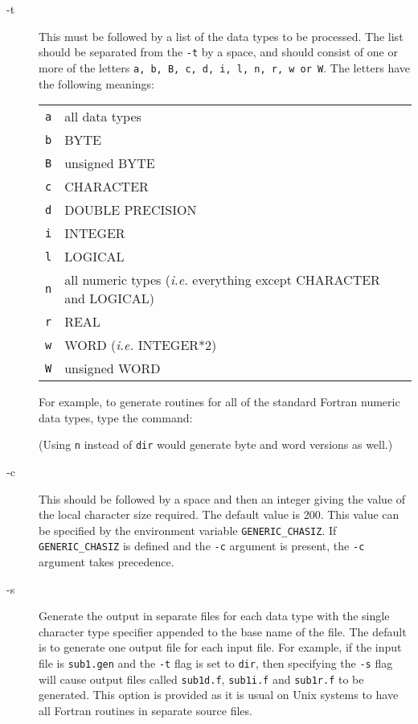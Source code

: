 \documentclass[twoside,11pt,nolof]{starlink}
\begin{document}
\begin{description}

\item[-t] This must be followed by a list of the data types to be
processed. The list should be separated from the \texttt{-t} by a space,
and should consist of one or more of the letters \texttt{a, b, B, c, d, i, l,
n, r, w or W}.  The letters have the following meanings:
\begin{center}
\begin{tabular}{ll}
\texttt{a} & all data types \\
\texttt{b} & BYTE \\
\texttt{B} & unsigned BYTE \\
\texttt{c} & CHARACTER \\
\texttt{d} & DOUBLE PRECISION \\
\texttt{i} & INTEGER \\
\texttt{l} & LOGICAL \\
\texttt{n} & all numeric types (\emph{i.e.} everything except CHARACTER and LOGICAL)\\
\texttt{r} & REAL \\
\texttt{w} & WORD (\emph{i.e.} INTEGER*2) \\
\texttt{W} & unsigned WORD \\
\end{tabular}
\end{center}

For example, to generate routines for all of the standard Fortran numeric data
types, type the command:

\begin{terminalv}
\end{terminalv}

(Using \texttt{n} instead of \texttt{dir} would generate byte and word versions as
well.)

\item[-c] This should be followed by a space and then an integer
giving the value of the local character size required.  The default
value is 200. This value can be specified by the environment variable
\texttt{GENERIC\_CHASIZ}.  If \texttt{GENERIC\_CHASIZ} is defined and the
\texttt{-c} argument is present, the \texttt{-c} argument takes precedence.

\item[-s] Generate the output in separate files for each data type
with the single character type specifier appended to the base name of
the file.  The default is to generate one output file for each input
file.  For example, if the input file is \texttt{sub1.gen} and the \texttt{-t} flag is set to \texttt{dir}, then specifying the \texttt{-s} flag will
cause output files called \texttt{sub1d.f}, \texttt{sub1i.f} and \texttt{sub1r.f} to be generated.  This option is provided as it is usual on
Unix systems to have all Fortran routines in separate source files.


\end{description}
\end{document}
